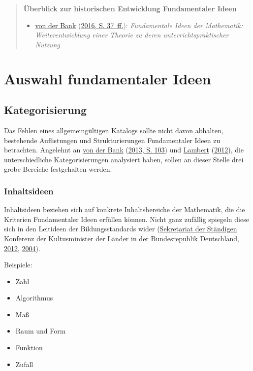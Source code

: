 \documentclass[
  ngerman,
]{scrbook}
\providecommand{\tightlist}{%
  \setlength{\itemsep}{0pt}\setlength{\parskip}{0pt}}
\theoremstyle{definition}
\theoremstyle{definition}
\theoremstyle{definition}
\theoremstyle{definition}
\theoremstyle{remark}
\begin{document}
\begin{quote}
\textbf{Überblick zur historischen Entwicklung Fundamentaler Ideen}

\begin{itemize}
\tightlist
\item
  \protect\hyperlink{ref-Bank:2016}{von der Bank} (\protect\hyperlink{ref-Bank:2016}{2016, S. 37~ff.}): \emph{Fundamentale Ideen der Mathematik: Weiterentwicklung einer Theorie zu deren unterrichtspraktischer Nutzung}
\end{itemize}
\end{quote}

\hypertarget{auswahl-fundamentaler-ideen}{%
\section{Auswahl fundamentaler Ideen}\label{auswahl-fundamentaler-ideen}}

\hypertarget{kategorisierung}{%
\subsection{Kategorisierung}\label{kategorisierung}}

Das Fehlen eines allgemeingültigen Katalogs sollte nicht davon abhalten, bestehende Auflistungen und Strukturierungen Fundamentaler Ideen zu betrachten. Angelehnt an \protect\hyperlink{ref-vonderBank:2013}{von der Bank} (\protect\hyperlink{ref-vonderBank:2013}{2013, S. 103}) und \protect\hyperlink{ref-Lambert:2012}{Lambert} (\protect\hyperlink{ref-Lambert:2012}{2012}), die unterschiedliche Kategorisierungen analysiert haben, sollen an dieser Stelle drei grobe Bereiche festgehalten werden.

\hypertarget{inhaltsideen}{%
\subsubsection{Inhaltsideen}\label{inhaltsideen}}

Inhaltsideen beziehen sich auf konkrete Inhaltsbereiche der Mathematik, die die Kriterien Fundamentaler Ideen erfüllen können. Nicht ganz zufällig spiegeln diese sich in den Leitideen der Bildungsstandards wider (\protect\hyperlink{ref-KMK:2012}{Sekretariat der Ständigen Konferenz der Kultusminister der Länder in der Bundesrepublik Deutschland, 2012}, \protect\hyperlink{ref-KMK:2004a}{2004}).

Beispiele:

\begin{itemize}
\tightlist
\item
  Zahl
\item
  Algorithmus
\item
  Maß
\item
  Raum und Form
\item
  Funktion
\item
  Zufall
\end{itemize}
\end{document}
